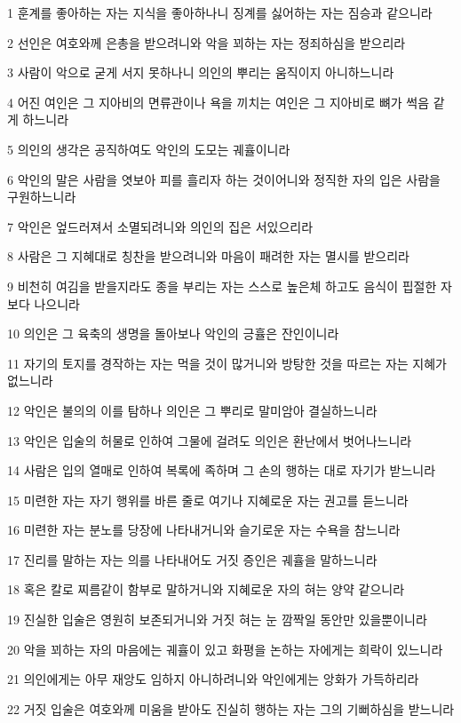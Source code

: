 \par 1 훈계를 좋아하는 자는 지식을 좋아하나니 징계를 싫어하는 자는 짐승과 같으니라
\par 2 선인은 여호와께 은총을 받으려니와 악을 꾀하는 자는 정죄하심을 받으리라
\par 3 사람이 악으로 굳게 서지 못하나니 의인의 뿌리는 움직이지 아니하느니라
\par 4 어진 여인은 그 지아비의 면류관이나 욕을 끼치는 여인은 그 지아비로 뼈가 썩음 같게 하느니라
\par 5 의인의 생각은 공직하여도 악인의 도모는 궤휼이니라
\par 6 악인의 말은 사람을 엿보아 피를 흘리자 하는 것이어니와 정직한 자의 입은 사람을 구원하느니라
\par 7 악인은 엎드러져서 소멸되려니와 의인의 집은 서있으리라
\par 8 사람은 그 지혜대로 칭찬을 받으려니와 마음이 패려한 자는 멸시를 받으리라
\par 9 비천히 여김을 받을지라도 종을 부리는 자는 스스로 높은체 하고도 음식이 핍절한 자보다 나으니라
\par 10 의인은 그 육축의 생명을 돌아보나 악인의 긍휼은 잔인이니라
\par 11 자기의 토지를 경작하는 자는 먹을 것이 많거니와 방탕한 것을 따르는 자는 지혜가 없느니라
\par 12 악인은 불의의 이를 탐하나 의인은 그 뿌리로 말미암아 결실하느니라
\par 13 악인은 입술의 허물로 인하여 그물에 걸려도 의인은 환난에서 벗어나느니라
\par 14 사람은 입의 열매로 인하여 복록에 족하며 그 손의 행하는 대로 자기가 받느니라
\par 15 미련한 자는 자기 행위를 바른 줄로 여기나 지혜로운 자는 권고를 듣느니라
\par 16 미련한 자는 분노를 당장에 나타내거니와 슬기로운 자는 수욕을 참느니라
\par 17 진리를 말하는 자는 의를 나타내어도 거짓 증인은 궤휼을 말하느니라
\par 18 혹은 칼로 찌름같이 함부로 말하거니와 지혜로운 자의 혀는 양약 같으니라
\par 19 진실한 입술은 영원히 보존되거니와 거짓 혀는 눈 깜짝일 동안만 있을뿐이니라
\par 20 악을 꾀하는 자의 마음에는 궤휼이 있고 화평을 논하는 자에게는 희락이 있느니라
\par 21 의인에게는 아무 재앙도 임하지 아니하려니와 악인에게는 앙화가 가득하리라
\par 22 거짓 입술은 여호와께 미움을 받아도 진실히 행하는 자는 그의 기뻐하심을 받느니라
